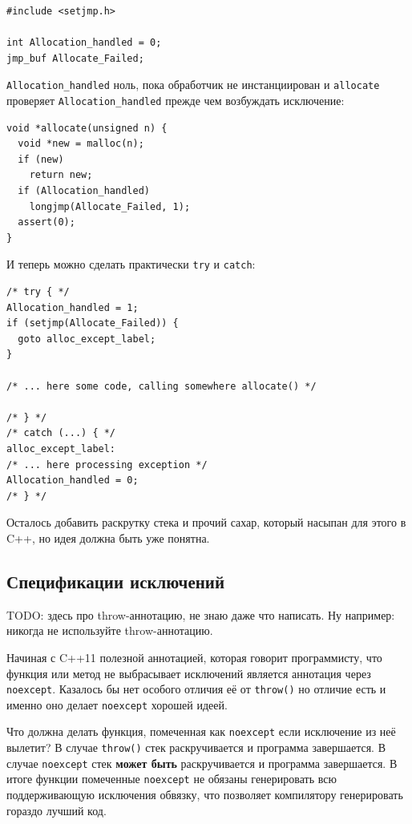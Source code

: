 \documentclass[a4paper,12pt,oneside]{article}
\begin{document}
\begin{lstlisting}
#include <setjmp.h>

int Allocation_handled = 0;
jmp_buf Allocate_Failed;
\end{lstlisting}

\lstinline!Allocation_handled! ноль, пока обработчик не инстанциирован и \lstinline!allocate! проверяет \lstinline!Allocation_handled! прежде чем возбуждать исключение:

\begin{lstlisting}
void *allocate(unsigned n) {
  void *new = malloc(n);
  if (new)
    return new;
  if (Allocation_handled)
    longjmp(Allocate_Failed, 1);
  assert(0);
}
\end{lstlisting}

И теперь можно сделать практически \lstinline!try! и \lstinline!catch!:

\begin{lstlisting}
/* try { */
Allocation_handled = 1;
if (setjmp(Allocate_Failed)) {
  goto alloc_except_label;
}

/* ... here some code, calling somewhere allocate() */

/* } */
/* catch (...) { */
alloc_except_label:
/* ... here processing exception */
Allocation_handled = 0;
/* } */
\end{lstlisting}

Осталось добавить раскрутку стека и прочий сахар, который насыпан для этого в C++, но идея должна быть уже понятна.

\pagebreak
\subsection{Спецификации исключений}\label{subsec:noexcept}

TODO: здесь про throw-аннотацию, не знаю даже что написать. Ну например: никогда не используйте throw-аннотацию.

Начиная с C++11 полезной аннотацией, которая говорит программисту, что функция или метод не выбрасывает исключений является аннотация через \lstinline!noexcept!. Казалось бы нет особого отличия её от \lstinline!throw()! но отличие есть и именно оно делает \lstinline!noexcept! хорошей идеей.

Что должна делать функция, помеченная как \lstinline!noexcept! если исключение из неё вылетит? В случае \lstinline!throw()! стек раскручивается и программа завершается. В случае \lstinline!noexcept! стек \textbf{может быть} раскручивается и программа завершается. В итоге функции помеченные \lstinline!noexcept! не обязаны генерировать всю поддерживающую исключения обвязку, что позволяет компилятору генерировать гораздо лучший код.
\end{document}

